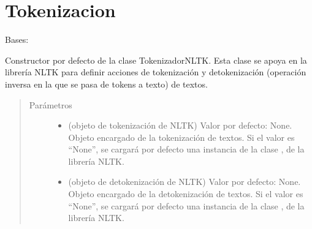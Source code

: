 \documentclass[letterpaper,10pt,openany,spanish]{sphinxmanual}
\begin{document}
\section{Tokenizacion}
\label{\detokenize{funciones/utils:module-utils.tokenizacion}}\label{\detokenize{funciones/utils:tokenizacion}}

\begin{fulllineitems}
\label{\detokenize{funciones/utils:utils.tokenizacion.TokenizadorNLTK}}
Bases: 

Constructor por defecto de la clase TokenizadorNLTK. Esta clase se apoya         en la librería NLTK para definir acciones de tokenización y detokenización         (operación inversa en la que se pasa de tokens a texto) de textos.
\begin{quote}\begin{description}
\item[{Parámetros}] \leavevmode\begin{itemize}
\item {} 
 \textendash{} (objeto de tokenización de NLTK) Valor por defecto: None. Objeto             encargado de la tokenización de textos. Si el valor es “None”, se cargará por             defecto una instancia de la clase , de la librería NLTK.

\item {} 
 \textendash{} (objeto de detokenización de NLTK) Valor por defecto: None. Objeto             encargado de la detokenización de textos. Si el valor es “None”, se cargará por             defecto una instancia de la clase , de la librería NLTK.

\end{itemize}

\end{description}\end{quote}


\end{fulllineitems}
\end{document}
